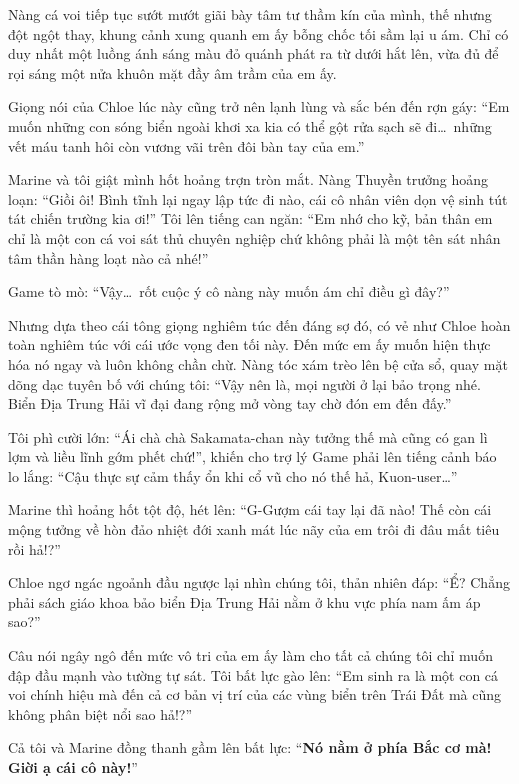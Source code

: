 \documentclass[../main.tex]{subfiles}
\begin{document}
Nàng cá voi tiếp tục sướt mướt giãi bày tâm tư thầm kín của mình, thế nhưng đột ngột thay, khung cảnh xung quanh em ấy bỗng chốc tối sầm lại u ám. Chỉ có duy nhất một luồng ánh sáng màu đỏ quánh phát ra từ dưới hắt lên, vừa đủ để rọi sáng một nửa khuôn mặt đầy âm trầm của em ấy.

Giọng nói của Chloe lúc này cũng trở nên lạnh lùng và sắc bén đến rợn gáy: ``Em muốn những con sóng biển ngoài khơi xa kia có thể gột rửa sạch sẽ đi\dots\ những vết máu tanh hôi còn vương vãi trên đôi bàn tay của em.''


Marine và tôi giật mình hốt hoảng trợn tròn mắt. Nàng Thuyền trưởng hoảng loạn: ``Giồi ôi! Bình tĩnh lại ngay lập tức đi nào, cái cô nhân viên dọn vệ sinh tút tát chiến trường kia ơi!'' Tôi lên tiếng can ngăn: ``Em nhớ cho kỹ, bản thân em chỉ là một con cá voi sát thủ chuyên nghiệp chứ không phải là một tên sát nhân tâm thần hàng loạt nào cả nhé!''

Game tò mò: ``Vậy\dots\ rốt cuộc ý cô nàng này muốn ám chỉ điều gì đây?''

Nhưng dựa theo cái tông giọng nghiêm túc đến đáng sợ đó, có vẻ như Chloe hoàn toàn nghiêm túc với cái ước vọng đen tối này. Đến mức em ấy muốn hiện thực hóa nó ngay và luôn không chần chừ. Nàng tóc xám trèo lên bệ cửa sổ, quay mặt dõng dạc tuyên bố với chúng tôi: ``Vậy nên là, mọi người ở lại bảo trọng nhé. Biển Địa Trung Hải vĩ đại đang rộng mở vòng tay chờ đón em đến đấy.''

Tôi phì cười lớn: ``Ái chà chà  Sakamata-chan này tưởng thế mà cũng có gan lì lợm và liều lĩnh gớm phết chứ!'', khiến cho trợ lý Game phải lên tiếng cảnh báo lo lắng: ``Cậu thực sự cảm thấy ổn khi cổ vũ cho nó thế hả, Kuon-user\dots''

Marine thì hoảng hốt tột độ, hét lên: ``G-Gượm cái tay lại đã nào! Thế còn cái mộng tưởng về hòn đảo nhiệt đới xanh mát lúc nãy của em trôi đi đâu mất tiêu rồi hả!?''

Chloe ngơ ngác ngoảnh đầu ngược lại nhìn chúng tôi, thản nhiên đáp: ``Ể? Chẳng phải sách giáo khoa bảo biển Địa Trung Hải nằm ở khu vực phía nam ấm áp sao?''

Câu nói ngây ngô đến mức vô tri của em ấy làm cho tất cả chúng tôi chỉ muốn đập đầu mạnh vào tường tự sát. Tôi bất lực gào lên: ``Em sinh ra là một con cá voi chính hiệu mà đến cả cơ bản vị trí của các vùng biển trên Trái Đất mà cũng không phân biệt nổi sao hả!?''

Cả tôi và Marine đồng thanh gầm lên bất lực: ``\textbf{Nó nằm ở phía Bắc cơ mà! Giời ạ cái cô này!}''
\end{document}
